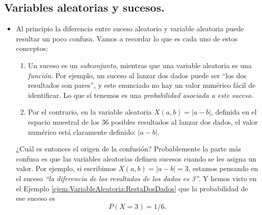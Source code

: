 \subsection{Variables aleatorias y sucesos.}

\begin{itemize}

        \item Al principio la diferencia entre suceso aleatorio y variable aleatoria puede resultar un poco confusa. Vamos a recordar lo que es cada uno de estos conceptos:
            \begin{enumerate}
                \item Un suceso es un {\em subconjunto}, mientras que una variable aleatoria es una {\em función}. Por ejemplo, un suceso al lanzar dos dados puede ser ``los dos resultados son pares'', y este enunciado no hay un valor numérico fácil de identificar. Lo que sí tenemos es una {\em probabilidad asociada a este suceso}.
                \item Por el contrario, en la variable aleatoria $X(a,b)=|a-b|$, definida en el espacio muestral de los 36 posibles resultados al lanzar dos dados, el valor numérico está claramente definido: $|a-b|$.
            \end{enumerate}
            ¿Cuál es entonces el origen de la confusión? Probablemente la parte más confusa es que {\sf las variables aleatorias definen sucesos cuando se les asigna un valor}. Por ejemplo, si escribimos $X(a,b)=|a-b|=3$, estamos pensando en el suceso {\em ``la diferencia de los resultados de los dados es 3''}. Y hemos visto en el Ejemplo \ref{ejem:VariableAleatoria:RestaDosDados} que la probabilidad de ese suceso es \[P(X=3)=1/6.\]


\end{itemize}
